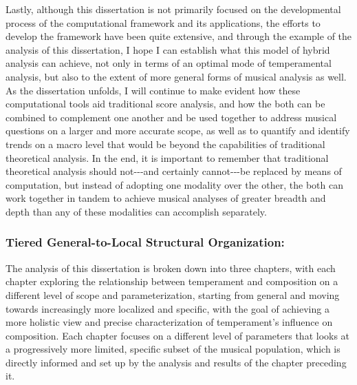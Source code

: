 Lastly, although this dissertation is not primarily focused on the
developmental process of the computational framework and its
applications, the efforts to develop the framework have been quite
extensive, and through the example of the analysis of this dissertation,
I hope I can establish what this model of hybrid analysis can achieve,
not only in terms of an optimal mode of temperamental analysis, but also
to the extent of more general forms of musical analysis as well. As the
dissertation unfolds, I will continue to make evident how these
computational tools aid traditional score analysis, and how the both can
be combined to complement one another and be used together to address
musical questions on a larger and more accurate scope, as well as to
quantify and identify trends on a macro level that would be beyond the
capabilities of traditional theoretical analysis. In the end, it is
important to remember that traditional theoretical analysis should
not-\/-\/-and certainly cannot-\/-\/-be replaced by means of
computation, but instead of adopting one modality over the other, the
both can work together in tandem to achieve musical analyses of greater
breadth and depth than any of these modalities can accomplish
separately.

\subsubsection{Tiered General-to-Local Structural
Organization:}\label{tiered-general-to-local-structural-organization}

The analysis of this dissertation is broken down into three chapters,
with each chapter exploring the relationship between temperament and
composition on a different level of scope and parameterization, starting
from general and moving towards increasingly more localized and
specific, with the goal of achieving a more holistic view and precise
characterization of temperament's influence on composition. Each chapter
focuses on a different level of parameters that looks at a progressively
more limited, specific subset of the musical population, which is
directly informed and set up by the analysis and results of the chapter
preceding it.


